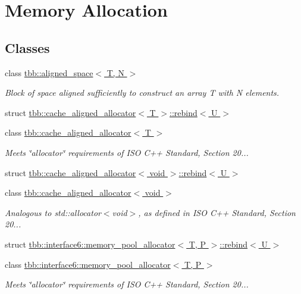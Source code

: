 \hypertarget{group__memory__allocation}{}\section{Memory Allocation}
\label{group__memory__allocation}
\subsection*{Classes}
\begin{DoxyCompactItemize}
\item 
class \hyperlink{classtbb_1_1aligned__space}{tbb\+::aligned\+\_\+space$<$ T, N $>$}
\begin{DoxyCompactList}\small\item\em Block of space aligned sufficiently to construct an array T with N elements. \end{DoxyCompactList}\item 
struct \hyperlink{structtbb_1_1cache__aligned__allocator_1_1rebind}{tbb\+::cache\+\_\+aligned\+\_\+allocator$<$ T $>$\+::rebind$<$ U $>$}
\item 
class \hyperlink{classtbb_1_1cache__aligned__allocator}{tbb\+::cache\+\_\+aligned\+\_\+allocator$<$ T $>$}
\begin{DoxyCompactList}\small\item\em Meets \char`\"{}allocator\char`\"{} requirements of I\+S\+O C++ Standard, Section 20... \end{DoxyCompactList}\item 
struct \hyperlink{structtbb_1_1cache__aligned__allocator_3_01void_01_4_1_1rebind}{tbb\+::cache\+\_\+aligned\+\_\+allocator$<$ void $>$\+::rebind$<$ U $>$}
\item 
class \hyperlink{classtbb_1_1cache__aligned__allocator_3_01void_01_4}{tbb\+::cache\+\_\+aligned\+\_\+allocator$<$ void $>$}
\begin{DoxyCompactList}\small\item\em Analogous to std\+::allocator$<$void$>$, as defined in I\+S\+O C++ Standard, Section 20... \end{DoxyCompactList}\item 
struct \hyperlink{structtbb_1_1interface6_1_1memory__pool__allocator_1_1rebind}{tbb\+::interface6\+::memory\+\_\+pool\+\_\+allocator$<$ T, P $>$\+::rebind$<$ U $>$}
\item 
class \hyperlink{classtbb_1_1interface6_1_1memory__pool__allocator}{tbb\+::interface6\+::memory\+\_\+pool\+\_\+allocator$<$ T, P $>$}
\begin{DoxyCompactList}\small\item\em Meets \char`\"{}allocator\char`\"{} requirements of I\+S\+O C++ Standard, Section 20... \end{DoxyCompactList}\item 

\end{DoxyCompactItemize}
